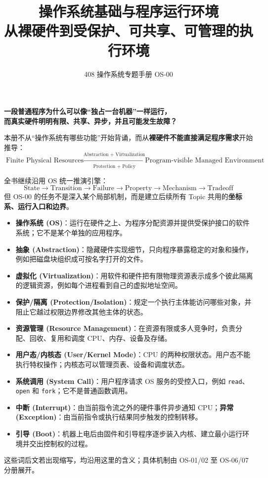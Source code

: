 \documentclass[11pt,a4paper]{ctexart}
\title{\vspace{-1.2cm}\textbf{操作系统基础与程序运行环境}\\[0.4em]
\large 从裸硬件到受保护、可共享、可管理的执行环境}
\author{408 操作系统专题手册 OS-00}
\date{}
\newcommand{\kw}[1]{\textbf{#1}}
\newcommand{\code}[1]{\texttt{#1}}
\begin{document}
\maketitle

\begin{corebox}
\begin{center}
\Large\bfseries 一段普通程序为什么可以像“独占一台机器”一样运行，\\
而真实硬件明明有限、共享、异步，并且可能发生故障？
\end{center}

本册不从“操作系统有哪些功能”开始背诵，而从\kw{裸硬件不能直接满足程序需求}开始推导：
\[
\boxed{
\text{Finite Physical Resources}
\xrightarrow[\text{Protection + Policy}]{\text{Abstraction + Virtualization}}
\text{Program-visible Managed Environment}
}
\]

全书继续沿用 OS 统一推演引擎：
\[
\boxed{
\text{State}\to\text{Transition}\to\text{Failure}\to\text{Property}\to\text{Mechanism}\to\text{Tradeoff}
}
\]
但 OS-00 的任务不是深入某个局部机制，而是建立后续所有 Topic 共用的\kw{坐标系、运行入口和边界}。
\end{corebox}

\begin{method}
\begin{itemize}[leftmargin=1.5em]
  \item \kw{操作系统 (OS)}：运行在硬件之上、为程序分配资源并提供受保护接口的软件系统；它不是某个单独的应用程序。
  \item \kw{抽象 (Abstraction)}：隐藏硬件实现细节，只向程序暴露稳定的对象和操作，例如把磁盘块组织成可按名字打开的文件。
  \item \kw{虚拟化 (Virtualization)}：用软件和硬件把有限物理资源表示成多个彼此隔离的逻辑资源，例如每个进程看到自己的虚拟地址空间。
  \item \kw{保护/隔离 (Protection/Isolation)}：规定一个执行主体能访问哪些对象，并阻止它越过权限边界修改其他主体的状态。
  \item \kw{资源管理 (Resource Management)}：在资源有限或多人竞争时，负责分配、回收、复用和调度 CPU、内存、设备及存储。
  \item \kw{用户态/内核态 (User/Kernel Mode)}：CPU 的两种权限状态。用户态不能执行特权操作；内核态可以管理页表、设备和调度状态。
  \item \kw{系统调用 (System Call)}：用户程序请求 OS 服务的受控入口，例如 \code{read}、\code{open} 和 \code{fork}；它不是普通函数调用。
  \item \kw{中断 (Interrupt)}：由当前指令流之外的硬件事件异步通知 CPU；\kw{异常 (Exception)}：由当前指令或执行结果同步触发的控制转移。
  \item \kw{引导 (Boot)}：机器上电后由固件和引导程序逐步装入内核、建立最小运行环境并交出控制权的过程。
\end{itemize}
这些词后文若出现缩写，均沿用这里的含义；具体机制由 OS-01/02 至 OS-06/07 分册展开。
\end{method}
\end{document}

